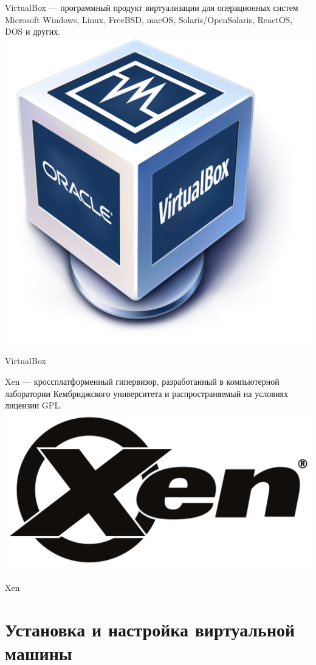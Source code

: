 \documentclass[a4paper,14pt]{extarticle}
\begin{document}
\centering
VirtualBox — программный продукт виртуализации для операционных систем Microsoft Windows, Linux, FreeBSD, macOS, Solaris/OpenSolaris, ReactOS, DOS и других.
\includegraphics[width=0.9\linewidth]{Virtualbox_logo.png}
\caption{VirtualBox}
\label{fig:mpr}





\centering
Xen — кроссплатформенный гипервизор, разработанный в компьютерной лаборатории Кембриджского университета и распространяемый на условиях лицензии GPL.
\includegraphics[width=1\linewidth]{Xen_hypervisor_logo_black.svg.png}
\caption{Xen}
\label{fig:mpr}


\newpage
\section{Установка и настройка виртуальной машины}
\end{document}
